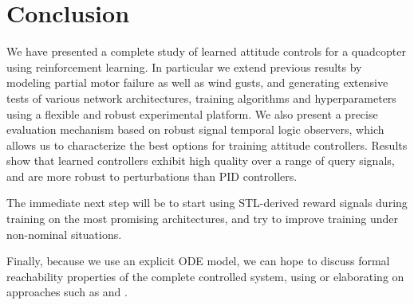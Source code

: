 \documentclass[anonymous=true,format=sigconf, screen=true, review=false]{acmart}
\begin{document}



\section{Conclusion}

We have presented a complete study of learned attitude controls for a quadcopter using reinforcement learning. In particular we extend previous results by modeling partial motor failure as well as wind gusts, and generating extensive tests of various network architectures, training algorithms and hyperparameters using a flexible and robust experimental platform. We also present a precise evaluation mechanism based on robust signal temporal logic observers, which allows us to characterize the best options for training attitude controllers.
Results show that learned controllers exhibit high quality over a range of query signals, and are more robust to perturbations than PID controllers.

The immediate next step will be to start
using STL-derived reward signals during training on the most promising
architectures, and try to improve training under non-nominal situations. 

Finally, because we use an explicit ODE model, we can hope to discuss formal reachability properties of the complete controlled system, using or elaborating on approaches such as \cite{sherlock} and \cite{goubault_putot}. 


\end{document}
